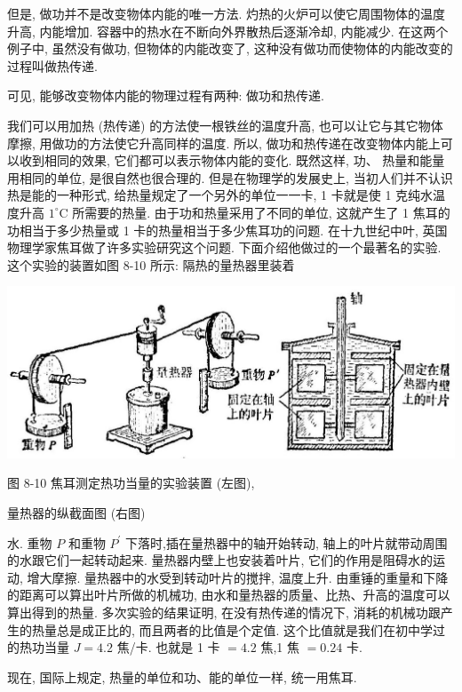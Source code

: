 \documentclass[10pt]{article}
\begin{document}
但是, 做功并不是改变物体内能的唯一方法. 灼热的火炉可以使它周围物体的温度升高, 内能增加. 容器中的热水在不断向外界散热后逐渐冷却, 内能减少. 在这两个例子中, 虽然没有做功, 但物体的内能改变了, 这种没有做功而使物体的内能改变的过程叫做热传递.

可见, 能够改变物体内能的物理过程有两种: 做功和热传递.

我们可以用加热 (热传递) 的方法使一根铁丝的温度升高, 也可以让它与其它物体摩擦, 用做功的方法使它升高同样的温度. 所以, 做功和热传递在改变物体内能上可以收到相同的效果, 它们都可以表示物体内能的变化. 既然这样, 功、 热量和能量用相同的单位, 是很自然也很合理的. 但是在物理学的发展史上, 当初人们并不认识热是能的一种形式, 给热量规定了一个另外的单位一一卡, 1 卡就是使 1 克纯水温度升高 \({1}^{ \circ }\mathrm{C}\) 所需要的热量. 由于功和热量采用了不同的单位, 这就产生了 1 焦耳的功相当于多少热量或 1 卡的热量相当于多少焦耳功的问题. 在十九世纪中叶, 英国物理学家焦耳做了许多实验研究这个问题. 下面介绍他做过的一个最著名的实验. 这个实验的装置如图 8-10 所示: 隔热的量热器里装着

\begin{center}
\includegraphics[max width=1.0\textwidth]{images/01912d55-147c-70aa-b0e0-1782a122f948_246_801050.jpg}
\end{center}

图 8-10 焦耳测定热功当量的实验装置 (左图),

量热器的纵截面图 (右图)

水. 重物 \(P\) 和重物 \({P}^{\prime }\) 下落时,插在量热器中的轴开始转动, 轴上的叶片就带动周围的水跟它们一起转动起来. 量热器内壁上也安装着叶片, 它们的作用是阻碍水的运动, 增大摩擦. 量热器中的水受到转动叶片的搅拌, 温度上升. 由重锤的重量和下降的距离可以算出叶片所做的机械功, 由水和量热器的质量、比热、升高的温度可以算出得到的热量. 多次实验的结果证明, 在没有热传递的情况下, 消耗的机械功跟产生的热量总是成正比的, 而且两者的比值是个定值. 这个比值就是我们在初中学过的热功当量 \(J = {4.2}\) 焦/卡. 也就是 1 卡 \(= {4.2}\) 焦,1 焦 \(= {0.24}\) 卡.

现在, 国际上规定, 热量的单位和功、能的单位一样, 统一用焦耳.
\end{document}
